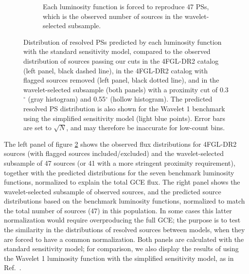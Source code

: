 \documentclass[letter,11pt]{article}
\begin{document}
\begin{figure}
\begin{subfigure}[b]{0.47\textwidth}
        \caption{Each luminosity function is forced to reproduce 47 PSs, which is the observed number of sources in the wavelet-selected subsample.}
        \label{fig:flux-distro-fix-count}
    \end{subfigure}
    \caption{Distribution of resolved PSs predicted by each luminosity function with the standard sensitivity model, compared to the observed distribution of sources passing our cuts in the 4FGL-DR2 catalog (left panel, black dashed line), in the 4FGL-DR2 catalog with flagged sources removed (left panel, black dotted line), and in the wavelet-selected subsample (both panels) with a proximity cut of 0.3$^\circ$ (gray histogram) and 0.55$^\circ$ (hollow histogram). The predicted resolved PS distribution is also shown for the Wavelet 1 benchmark using the simplified sensitivity model (light blue points). Error bars are set to $\sqrt{N}$, and may therefore be inaccurate for low-count bins.}
    \label{fig:flux-distro}
\end{figure}

The left panel of figure \ref{fig:flux-distro} shows the observed flux distributions for 4FGL-DR2 sources (with flagged sources included/excluded) and the wavelet-selected subsample of 47 sources (or 41 with a more stringent proximity requirement), together with the predicted distributions for the seven benchmark luminosity functions, normalized to explain the total GCE flux. The right panel shows the wavelet-selected subsample of observed sources, and the predicted source distributions based on the benchmark luminosity functions, normalized to match the total number of sources (47) in this population. In some cases this latter normalization would require overproducing the full GCE; the purpose is to test the similarity in the distributions of resolved sources between models, when they are forced to have a common normalization. Both panels are calculated with the standard sensitivity model; for comparison, we also display the results of using the Wavelet 1 luminosity function with the simplified sensitivity model, as in Ref.~\cite{Zhong:2019ycb}.
\end{document}
